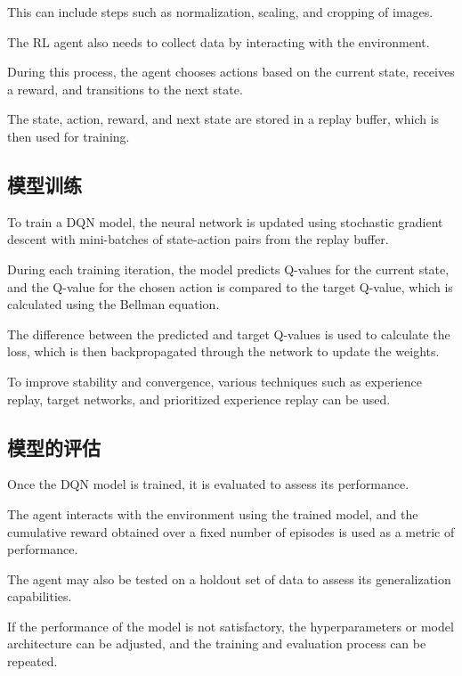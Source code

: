 This can include steps such as normalization, scaling, and cropping of images.

The RL agent also needs to collect data by interacting with the environment.

During this process, the agent chooses actions based on the current state, receives a reward, and transitions to the next state.

The state, action, reward, and next state are stored in a replay buffer, which is then used for training.

\subsection{模型训练}

To train a DQN model, the neural network is updated using stochastic gradient descent with mini-batches of state-action pairs from the replay buffer.

During each training iteration, the model predicts Q-values for the current state, and the Q-value for the chosen action is compared to the target Q-value, which is calculated using the Bellman equation.

The difference between the predicted and target Q-values is used to calculate the loss, which is then backpropagated through the network to update the weights.

To improve stability and convergence, various techniques such as experience replay, target networks, and prioritized experience replay can be used.

\subsection{模型的评估}

Once the DQN model is trained, it is evaluated to assess its performance.

The agent interacts with the environment using the trained model, and the cumulative reward obtained over a fixed number of episodes is used as a metric of performance.

The agent may also be tested on a holdout set of data to assess its generalization capabilities.

If the performance of the model is not satisfactory, the hyperparameters or model architecture can be adjusted, and the training and evaluation process can be repeated.